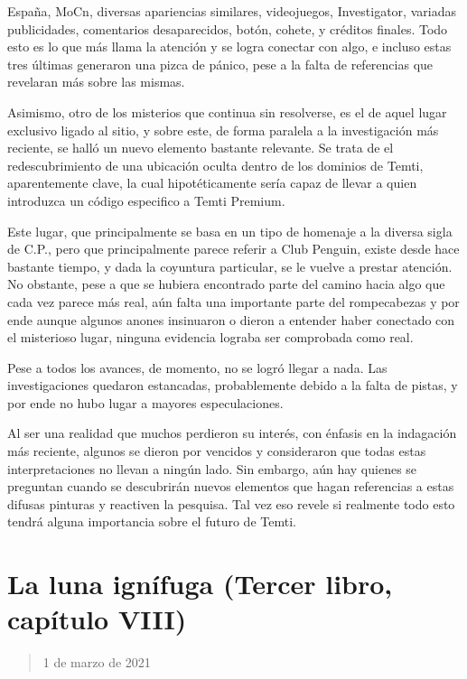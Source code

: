 \documentclass[
]{book}
\begin{document}
España, MoCn, diversas apariencias similares, videojuegos, Investigator, variadas publicidades, comentarios desaparecidos, botón, cohete, y créditos finales. Todo esto es lo que más llama la atención y se logra conectar con algo, e incluso estas tres últimas generaron una pizca de pánico, pese a la falta de referencias que revelaran más sobre las mismas.

Asimismo, otro de los misterios que continua sin resolverse, es el de aquel lugar exclusivo ligado al sitio, y sobre este, de forma paralela a la investigación más reciente, se halló un nuevo elemento bastante relevante. Se trata de el redescubrimiento de una ubicación oculta dentro de los dominios de Temti, aparentemente clave, la cual hipotéticamente sería capaz de llevar a quien introduzca un código especifico a Temti Premium.

Este lugar, que principalmente se basa en un tipo de homenaje a la diversa sigla de C.P., pero que principalmente parece referir a Club Penguin, existe desde hace bastante tiempo, y dada la coyuntura particular, se le vuelve a prestar atención. No obstante, pese a que se hubiera encontrado parte del camino hacia algo que cada vez parece más real, aún falta una importante parte del rompecabezas y por ende aunque algunos anones insinuaron o dieron a entender haber conectado con el misterioso lugar, ninguna evidencia lograba ser comprobada como real.

Pese a todos los avances, de momento, no se logró llegar a nada. Las investigaciones quedaron estancadas, probablemente debido a la falta de pistas, y por ende no hubo lugar a mayores especulaciones.

Al ser una realidad que muchos perdieron su interés, con énfasis en la indagación más reciente, algunos se dieron por vencidos y consideraron que todas estas interpretaciones no llevan a ningún lado. Sin embargo, aún hay quienes se preguntan cuando se descubrirán nuevos elementos que hagan referencias a estas difusas pinturas y reactiven la pesquisa. Tal vez eso revele si realmente todo esto tendrá alguna importancia sobre el futuro de Temti.

\hypertarget{la-luna-ignuxedfuga-tercer-libro-capuxedtulo-viii}{%
\section{La luna ignífuga (Tercer libro, capítulo VIII)}\label{la-luna-ignuxedfuga-tercer-libro-capuxedtulo-viii}}

\begin{quote}
1 de marzo de 2021
\end{quote}
\end{document}
